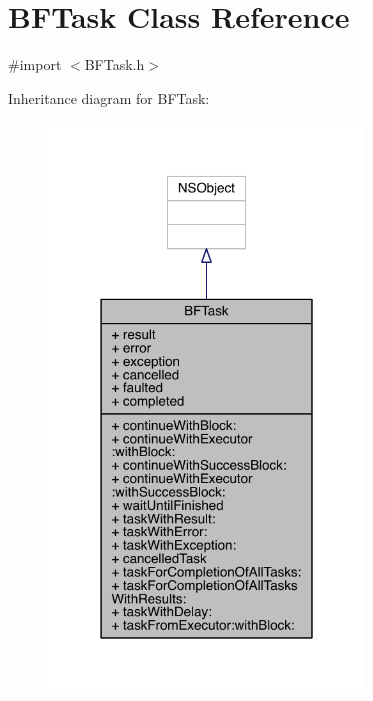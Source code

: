 \hypertarget{interface_b_f_task}{\section{B\-F\-Task Class Reference}
\label{interface_b_f_task}
}


{\ttfamily \#import $<$B\-F\-Task.\-h$>$}



Inheritance diagram for B\-F\-Task\-:
\nopagebreak
\begin{figure}[H]
\begin{center}
\leavevmode
\includegraphics[width=238pt]{interface_b_f_task__inherit__graph}
\end{center}
\end{figure}


